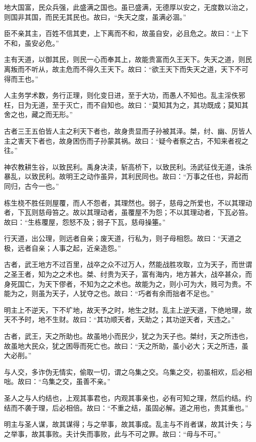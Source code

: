 \documentclass[]{article}
\begin{document}
地大国富，民众兵强，此盛满之国也。虽已盛满，无德厚以安之，无度数以治之，则国非其国，而民无其民也。故曰，``失天之度，虽满必涸。''

臣不亲其主，百姓不信其吏，上下离而不和，故虽自安，必且危之。故曰：``上下不和，虽安必危。''

主有天道，以御其民，则民一心而奉其上，故能贵富而久王天下。失天之道，则民离叛而不听从，故主危而不得久王天下。故曰：``欲王天下而失天之道，天下不可得而王也。''

人主务学术数，务行正理，则化变日进，至于大功，而愚人不知也。乱主淫佚邪枉，日为无道，至于灭亡，而不自知也。故曰：``莫知其为之，其功既成；莫知其舍之也，藏之而无形。''

古者三王五伯皆人主之利天下者也，故身贵显而子孙被其泽。桀，纣、幽、厉皆人主之害天下者也，故身困伤而子孙蒙其祸。故曰：``疑今者察之古，不知来者视之往。''

神农教耕生谷，以致民利。禹身决渎，斩高桥下，以致民利。汤武征伐无道，诛杀暴乱，以致民利。故明王之动作虽异，其利民同也。故曰：``万事之任也，异起而同归，古今一也。''

栋生桡不胜任则屋覆，而人不怨者，其理然也。弱子，慈母之所爱也，不以其理动者，下瓦则慈母笞之。故以其理动者，虽覆屋不为怨；不以其理动者，下瓦必笞。故曰：``生栋覆屋，怨怒不及；弱子下瓦，慈母操箠。''

行天道，出公理，则远者自亲；废天道，行私为，则子母相怨。故曰：``天道之极，远者自亲；人事之起，近亲造怨。''

古者，武王地方不过百里，战卒之众不过万人，然能战胜攻取，立为天子，而世谓之圣王者，知为之之术也。桀、纣贵为天子，富有海内，地方甚大，战卒甚众，而身死国亡，为天下僇者，不知为之之术也。故能为之，则小可为大，贱可为贵。不能为之，则虽为天子，人犹夺之也。故曰：``巧者有余而拙者不足也。''

明主上不逆天，下不圹地，故天予之时，地生之财。乱主上逆天道，下绝地理，故天不予时，地不生财。故曰：``其功顺天者，天助之；其功逆天者，天违之。''

古者，武王，天之所助也。故虽地小而民少，犹之为天子也。桀纣，天之所违也，故虽地大民众，犹之困辱而死亡也。故曰：``天之所助，虽小必大；天之所违，虽大必削。''

与人交，多诈伪无情实，偷取一切，谓之乌集之交。乌集之交，初虽相欢，后必相咄。故曰：``乌集之交，虽善不亲。''

圣人之与人约结也，上观其事君也，内观其事亲也，必有可知之理，然后约结。约结而不袭于理，后必相倍。故曰：``不重之结，虽固必解。道之用也，贵其重也。''

明主与圣人谋，故其谋得；与之举事，故其事成。乱主与不肖者谋，故其计失；与之举事，故其事败。夫计失而事败，此与不可之罪。故曰：``毋与不可。''
\end{document}
